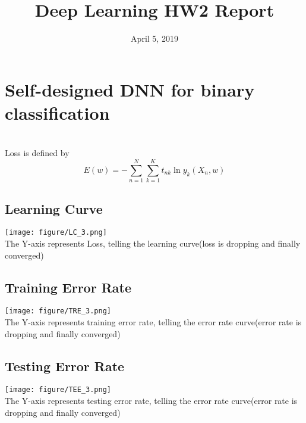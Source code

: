 \documentclass[11pt, a4paper]{article} %
\title{Deep Learning HW2 Report} %
\begin{document}


\date{April 5, 2019}
\begin{comment}
\end{comment}
\maketitle{} %

\setcounter{page}{1} %

\section{Self-designed DNN for binary classification} %
\\ Loss is defined by $${E(w) = -\sum_{n = 1}^N\sum_{k = 1}^K t_{nk}\ln y_k(X_n, w)}$$
\subsection{Learning Curve} %
\texttt{[image: figure/LC\_3.png]}
\\ The Y-axis represents Loss, telling the learning curve(loss is dropping and finally converged)

\subsection{Training Error Rate} %
\texttt{[image: figure/TRE\_3.png]}
\\ The Y-axis represents training error rate, telling the error rate curve(error rate is dropping and finally converged)

\subsection{Testing Error Rate} %
\texttt{[image: figure/TEE\_3.png]}
\\ The Y-axis represents testing error rate, telling the error rate curve(error rate is dropping and finally converged)
\end{document}
